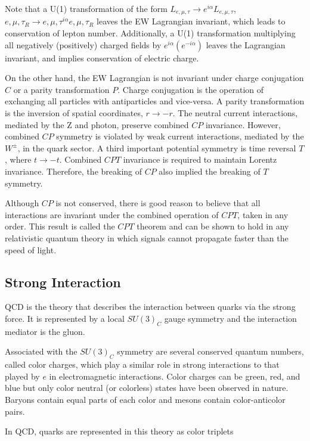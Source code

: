 Note that a U(1) transformation of the form $L_{e,\mu,\tau}\rightarrow e^{i\alpha}L_{e,\mu,\tau}$, $e,\mu,\tau_{R}\rightarrow e,\mu,\tau^{i\alpha}e,\mu,\tau_{R}$ leaves the EW Lagrangian invariant, which leads to conservation of lepton number. Additionally, a U(1) transformation multiplying all negatively (positively) charged fields by $e^{i\alpha}(e^{-i\alpha})$ leaves the Lagrangian invariant, and implies conservation of electric charge.

On the other hand, the EW Lagrangian is not invariant under charge conjugation $C$ or a parity transformation $P$. Charge conjugation is the operation of exchanging all particles with antiparticles and vice-versa. A parity transformation is the inversion of spatial coordinates, $r\rightarrow -r$. The neutral current interactions, mediated by the Z and photon, preserve combined $CP$ invariance. However, combined $CP$ symmetry is violated by weak current interactions, mediated by the $W^{\pm}$, in the quark sector. A third important potential symmetry is time reversal $T$, where $t\rightarrow -t$. Combined $CPT$ invariance is required to maintain Lorentz invariance. Therefore, the breaking of $CP$ also implied the breaking of $T$ symmetry.

Although $CP$ is not conserved, there is good reason to believe that all interactions are invariant under the combined operation of $CPT$, taken in any order. This result is called the $CPT$ theorem\cite{PhysRev.82.914} and can be shown to hold in any relativistic quantum theory in which signals cannot propagate faster than the speed of light.

\subsection{Strong Interaction}

QCD is the theory that describes the interaction between quarks via the strong force. It is represented by a local $SU(3)_{C}$ gauge symmetry and the interaction mediator is the gluon.

Associated with the $SU(3)_{C}$ symmetry are several conserved quantum numbers, called color charges, which play a similar role in strong interactions to that played by $e$ in electromagnetic interactions. Color charges can be green, red, and blue but only color neutral (or colorless) states have been observed in nature. Baryons contain equal parts of each color and mesons contain color-anticolor pairs.

In QCD, quarks are represented in this theory as color triplets

